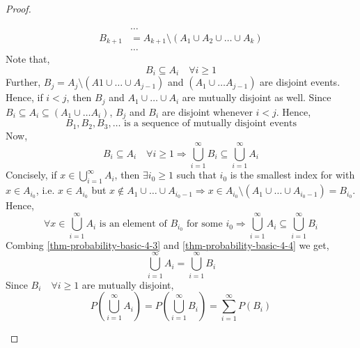 \begin{proof}
\begin{enumerate}[noitemsep,topsep=0pt]
\begin{align*}
            &  \dots                                                         \\
        B_{k+1} &= A_{k+1} \setminus (A_1 \cup A_2 \cup \dots \cup A_k)      \\
            &  \dots
    \end{align*}
    Note that,
    \begin{equation}
        \label{thm-probability-basic-4-1}
        B_i \subseteq A_i \quad \forall i \geq 1
    \end{equation}
    Further, $B_j = A_j \setminus (A1 \cup \dots \cup A_{j-1})$ and $(A_1 \cup
    \dots A_{j-1})$ are disjoint events. Hence, if $i < j$, then $B_j$ and
    $A_1 \cup \dots \cup A_i$ are mutually disjoint as well. Since $B_i
    \subseteq A_i \subseteq (A_1 \cup \dots A_i)$, $B_j$ and $B_i$ are disjoint
    whenever $i < j$. Hence,
    \begin{equation}
        \label{thm-probability-basic-4-2}
        B_1, B_2, B_3, \dots \text{ is a sequence of mutually disjoint events}
    \end{equation}
    Now,
    \begin{equation}
        \label{thm-probability-basic-4-3}
        B_i \subseteq A_i \quad \forall i \geq 1
        \Rightarrow
        \bigcup_{i=1}^\infty B_i \subseteq \bigcup_{i=1}^\infty A_i
    \end{equation}
    Concisely, if $x \in \bigcup_{i=1}^\infty A_i$, then $\exists i_0 \geq 1$
    such that $i_0$ is the smallest index for with $x \in A_{i_0}$, i.e. $x
    \in A_{i_0}$ but $x \notin A_1 \cup \dots \cup A_{i_0 - 1} \Rightarrow x
    \in A_{i_0} \setminus (A_1 \cup \dots \cup A_{i_0 - 1}) = B_{i_0}$. Hence,
    \begin{equation}
        \label{thm-probability-basic-4-4}
        \forall x \in \bigcup_{i = 1}^\infty A_i
        \text{ is an element of } B_{i_0}
        \text{ for some } i_0
        \Rightarrow
        \bigcup_{i=1}^\infty A_i \subseteq \bigcup_{i=1}^\infty B_i
    \end{equation}
    Combing \ref{thm-probability-basic-4-3} and \ref{thm-probability-basic-4-4}
    we get,
    \begin{equation*}
        \bigcup_{i=1}^\infty A_i = \bigcup_{i=1}^\infty B_i
    \end{equation*}
    Since $B_i \quad \forall i \geq 1$ are mutually disjoint,
    \begin{equation*}
        P(\bigcup_{i=1}^\infty A_i) = P(\bigcup_{i=1}^\infty B_i)
                                    = \sum_{i=1}^\infty P(B_i)

\end{equation*}
\end{enumerate}
\end{proof}

